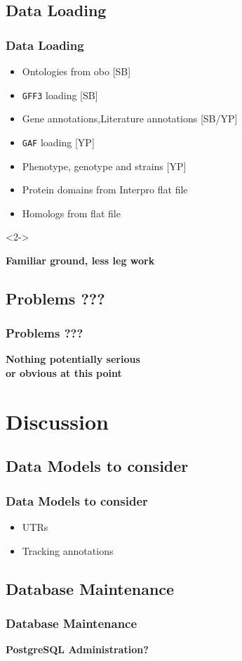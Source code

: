 \documentclass[hyperref={pdfpagelabels=false}, compress]{beamer}
\begin{document}
\subsection{Data Loading}
\begin{frame}
  	\frametitle{Data Loading}
  	\begin{itemize}
		\item Ontologies from obo [SB]
       	\item \texttt{GFF3} loading [SB]
       	\item Gene annotations,Literature annotations [SB/YP]
       	\item \texttt{GAF} loading [YP]
       	\item Phenotype, genotype and strains [YP]
       	\item Protein domains from Interpro flat file
       	\item Homologs from flat file
  	\end{itemize}
  	
	\begin{block}{}<2->
  		\begin{center}
  			\textbf{\Large Familiar ground, less leg work}
		\end{center}
	\end{block}
	
\end{frame}

\subsection{Problems ???}  
\begin{frame}
	\frametitle{Problems ???} 
	\begin{center} 
		\textbf{\Large Nothing potentially serious\\ or obvious at this point}
	\end{center}
\end{frame}


\section{Discussion}
\subsection{Data Models to consider}
\begin{frame}
    \frametitle{Data Models to consider}
	\begin{itemize}
		\item UTRs
		\item Tracking annotations
	\end{itemize}        
\end{frame}

\subsection{Database Maintenance}
\begin{frame}
   \frametitle{Database Maintenance}
   \begin{center}
   		\textbf{\Large PostgreSQL Administration?}
   	\end{center}
\end{frame}

\end{document}
